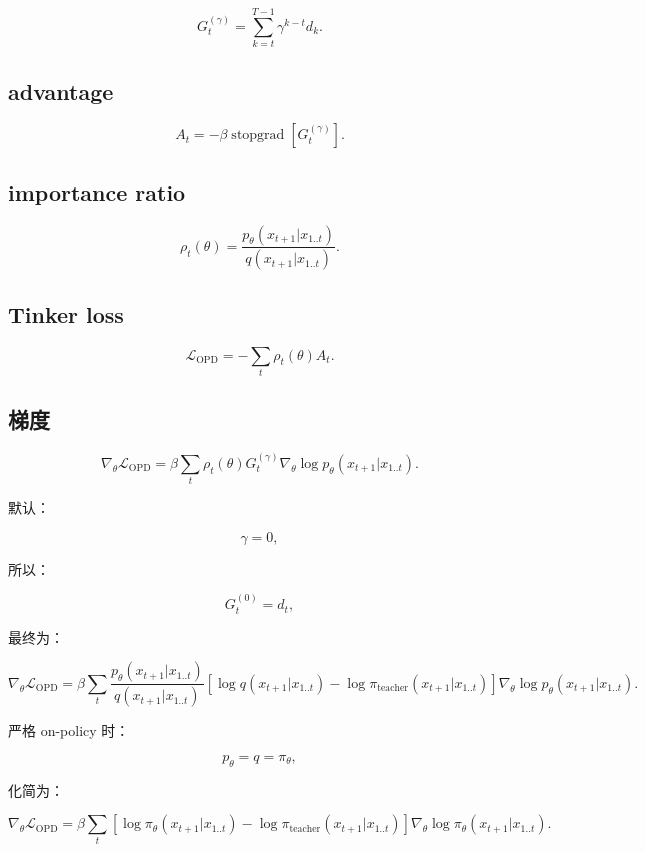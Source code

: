 \documentclass[11pt,a4paper,fontset=fandol]{ctexart}
\begin{document}
\[
G_t^{(\gamma)}
=
\sum_{k=t}^{T-1}
\gamma^{k-t}d_k.
\]

\subsection{advantage}

\[
\boxed{
A_t
=
-\beta\operatorname{stopgrad}
\left[
G_t^{(\gamma)}
\right].
}
\]

\subsection{importance ratio}

\[
\boxed{
\rho_t(\theta)
=
\frac{
p_\theta(x_{t+1}|x_{1..t})
}{
q(x_{t+1}|x_{1..t})
}.
}
\]

\subsection{Tinker loss}

\[
\boxed{
\mathcal L_{\mathrm{OPD}}
=
-\sum_t
\rho_t(\theta)A_t.
}
\]

\subsection{梯度}

\[
\boxed{
\nabla_\theta\mathcal L_{\mathrm{OPD}}
=
\beta
\sum_t
\rho_t(\theta)
G_t^{(\gamma)}
\nabla_\theta
\log p_\theta(x_{t+1}|x_{1..t}).
}
\]

默认：

\[
\gamma=0,
\]

所以：

\[
G_t^{(0)}=d_t,
\]

最终为：

\[
\boxed{
\nabla_\theta\mathcal L_{\mathrm{OPD}}
=
\beta
\sum_t
\frac{p_\theta(x_{t+1}|x_{1..t})}
{q(x_{t+1}|x_{1..t})}
\left[
\log q(x_{t+1}|x_{1..t})
-
\log\pi_{\text{teacher}}(x_{t+1}|x_{1..t})
\right]
\nabla_\theta
\log p_\theta(x_{t+1}|x_{1..t}).
}
\]

严格 on-policy 时：

\[
p_\theta=q=\pi_\theta,
\]

化简为：

\[
\boxed{
\nabla_\theta\mathcal L_{\mathrm{OPD}}
=
\beta
\sum_t
\left[
\log\pi_\theta(x_{t+1}|x_{1..t})
-
\log\pi_{\text{teacher}}(x_{t+1}|x_{1..t})
\right]
\nabla_\theta
\log\pi_\theta(x_{t+1}|x_{1..t}).
}
\]
\end{document}
